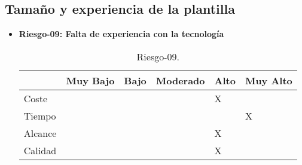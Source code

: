\subsection{Tamaño y experiencia de la plantilla}
\begin{itemize}
	\item \textbf{Riesgo-09: Falta de experiencia con la tecnología}
	\begin{table}[H]
	\begin{center}
	\begin{tabular}{ l l l l l l }
	\hline
	& Muy Bajo & Bajo & Moderado & Alto & Muy Alto \\ \hline \hline
	Coste &  &  &  & X &  \\ \hline
	Tiempo &  &  &  &  & X \\ \hline
	Alcance &  &  &  & X &  \\ \hline
	Calidad &  &  &  & X &  \\ \hline
	\end{tabular}
	\caption{Riesgo-09.}
	\label{Riesgo-09}
	\end{center}
	\end{table}
\end{itemize}
